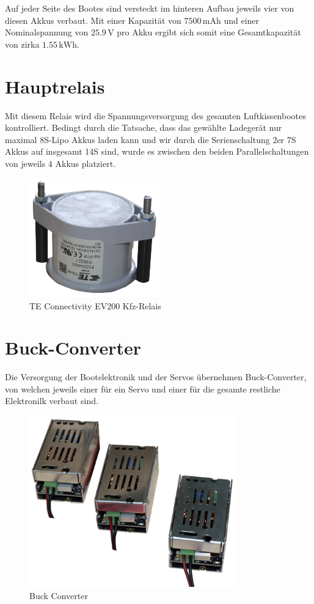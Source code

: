 Auf jeder Seite des Bootes sind versteckt im hinteren Aufbau jeweils vier von diesen Akkus verbaut. Mit einer Kapazität von $7500\,\textrm{mAh}$ und einer Nominalspannung von $25.9\,\mathrm{V}$ pro Akku ergibt sich somit eine Gesamtkapazität von zirka $1.55\,\mathrm{kWh}$.

\newpage
\section{Hauptrelais}
Mit diesem Relais wird die Spannungsversorgung des gesamten Luftkissenbootes kontrolliert. Bedingt durch die Tatsache, dass das gewählte Ladegerät nur maximal 8S-Lipo Akkus laden kann und wir durch die Serienschaltung 2er 7S Akkus auf insgesamt 14S sind, wurde es zwischen den beiden Parallelschaltungen von jeweils 4 Akkus platziert. 
\begin{figure}[h]
    \centering
    \includegraphics[width=0.5\textwidth]{Fotos/Hauptrelais.png}
    \caption{TE Connectivity EV200 Kfz-Relais}
\end{figure}

\newpage
\section{Buck-Converter}
Die Versorgung der Bootelektronik und der Servos übernehmen Buck-Converter, von welchen jeweils einer für ein Servo und einer für die gesamte restliche Elektronilk verbaut sind.
\begin{figure}[h]
    \centering
    \includegraphics[width=0.8\textwidth]{Fotos/Buck_Converter.png}
    \caption{Buck Converter}
\end{figure}

